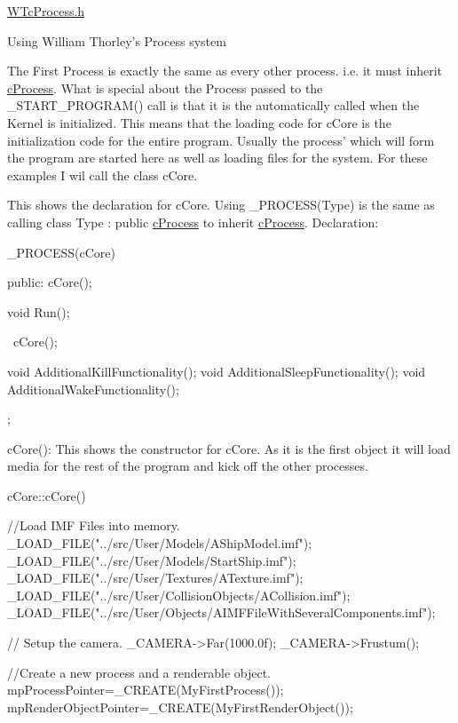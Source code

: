 \hyperlink{_w_tc_process_8h_source}{WTcProcess.h}

Using William Thorley’s Process system

The First Process is exactly the same as every other process. i.e. it must inherit \hyperlink{classc_process}{cProcess}. What is special about the Process passed to the \_\-START\_\-PROGRAM() call is that it is the automatically called when the Kernel is initialized. This means that the loading code for cCore is the initialization code for the entire program. Usually the process’ which will form the program are started here as well as loading files for the system. For these examples I wil call the class cCore.

This shows the declaration for cCore. Using \_\-PROCESS(Type) is the same as calling class Type : public \hyperlink{classc_process}{cProcess} to inherit \hyperlink{classc_process}{cProcess}. Declaration: 
\begin{DoxyCode}
 _PROCESS(cCore)
 {
  public:
  cCore();
 
  void Run();
 
  ~cCore();
 
 void AdditionalKillFunctionality();
 void AdditionalSleepFunctionality();
 void AdditionalWakeFunctionality();
 
 };
\end{DoxyCode}


cCore(): This shows the constructor for cCore. As it is the first object it will load media for the rest of the program and kick off the other processes. 
\begin{DoxyCode}
 cCore::cCore()
 {
 //Load IMF Files into memory.
  _LOAD_FILE("../src/User/Models/AShipModel.imf");
  _LOAD_FILE("../src/User/Models/StartShip.imf");
  _LOAD_FILE("../src/User/Textures/ATexture.imf");
  _LOAD_FILE("../src/User/CollisionObjects/ACollision.imf");
  _LOAD_FILE("../src/User/Objects/AIMFFileWithSeveralComponents.imf");

 // Setup the camera.
  _CAMERA->Far(1000.0f);
  _CAMERA->Frustum();
 
 //Create a new process and a renderable object.
  mpProcessPointer=_CREATE(MyFirstProcess());
  mpRenderObjectPointer=_CREATE(MyFirstRenderObject());

 }
\end{DoxyCode}


